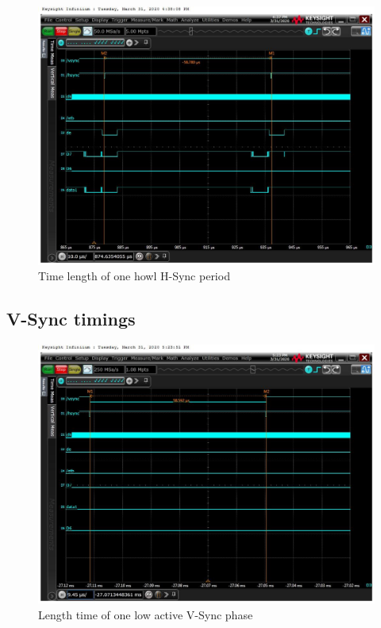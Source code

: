 \begin{figure}[ht]
\begin{center}
    \includegraphics[width=13cm]{pictures/lcd_timings/hsync_periode.jpg}
\end{center}
\caption{Time length of one howl H-Sync period}
\label{fig:hsync_period}
\end{figure}


\subsection{V-Sync timings}%
\label{sub:V-Sync timings}

\begin{figure}[ht]
\begin{center}
    \includegraphics[width=13cm]{pictures/lcd_timings/vsync_length.jpg}
\end{center}
\caption{Length time of one low active V-Sync phase}
\label{fig:vsync_active_time}
\end{figure}


